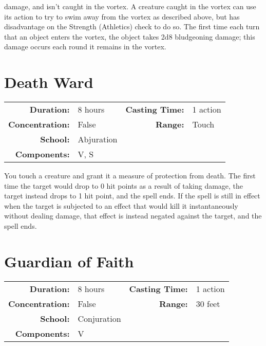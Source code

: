 \documentclass[a5paper, 12pt]{memoir}
\begin{document}
damage, and isn't caught in the vortex. A creature caught in the vortex can use its action to try to swim away from the vortex as described above, but has disadvantage on the Strength (Athletics) check to do so. The first time each turn that an object enters the vortex, the object takes 2d8 bludgeoning damage; this damage occurs each round it remains in the vortex.

\newpage
\section*{Death Ward}

{
\small\centering\vspace{-6pt}
\begin{tabular}{rlrl}
\toprule

\textbf{Duration:} & 8 hours &
\textbf{Casting Time:} & 1 action \\
\textbf{Concentration:} & False &
\textbf{Range:} & Touch \\
\textbf{School:} & Abjuration \\
\textbf{Components:} & \multicolumn{3}{p{0.7\textwidth}}{V, S}\\

\bottomrule
\end{tabular}
}

\vspace{1\baselineskip}\noindent You touch a creature and grant it a measure of protection from death. The first time the target would drop to 0 hit points as a result of taking damage, the target instead drops to 1 hit point, and the spell ends. If the spell is still in effect when the target is subjected to an effect that would kill it instantaneously without dealing damage, that effect is instead negated against the target, and the spell ends.

\newpage
\section*{Guardian of Faith}

{
\small\centering\vspace{-6pt}
\begin{tabular}{rlrl}
\toprule

\textbf{Duration:} & 8 hours &
\textbf{Casting Time:} & 1 action \\
\textbf{Concentration:} & False &
\textbf{Range:} & 30 feet \\
\textbf{School:} & Conjuration \\
\textbf{Components:} & \multicolumn{3}{p{0.7\textwidth}}{V}\\

\bottomrule
\end{tabular}
}
\end{document}
